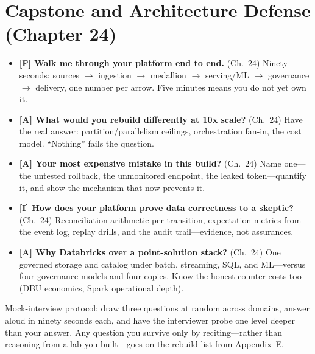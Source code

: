 \section{Capstone and Architecture Defense (Chapter 24)}
%
\begin{itemize}
    \item \textbf{[F] Walk me through your platform end to end.} (Ch.~24) Ninety seconds:
    sources $\rightarrow$ ingestion $\rightarrow$ medallion $\rightarrow$ serving/ML
    $\rightarrow$ governance $\rightarrow$ delivery, one number per arrow. Five minutes means
    you do not yet own it.
    \item \textbf{[A] What would you rebuild differently at 10x scale?} (Ch.~24) Have the real
    answer: partition/parallelism ceilings, orchestration fan-in, the cost model. ``Nothing''
    fails the question.
    \item \textbf{[A] Your most expensive mistake in this build?} (Ch.~24) Name one---the
    untested rollback, the unmonitored endpoint, the leaked token---quantify it, and show the
    mechanism that now prevents it.
    \item \textbf{[I] How does your platform prove data correctness to a skeptic?} (Ch.~24)
    Reconciliation arithmetic per transition, expectation metrics from the event log, replay
    drills, and the audit trail---evidence, not assurances.
    \item \textbf{[A] Why Databricks over a point-solution stack?} (Ch.~24) One governed
    storage and catalog under batch, streaming, SQL, and ML---versus four governance models
    and four copies. Know the honest counter-costs too (DBU economics, Spark operational
    depth).
\end{itemize}

\begin{tipbox}
Mock-interview protocol: draw three questions at random across domains, answer aloud in
ninety seconds each, and have the interviewer probe one level deeper than your answer. Any
question you survive only by reciting---rather than reasoning from a lab you built---goes on
the rebuild list from Appendix~E.
\end{tipbox}
